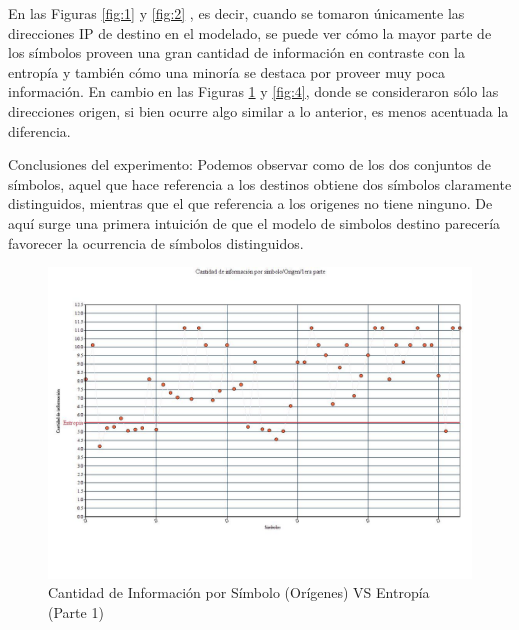 En las Figuras \ref{fig:1} y \ref{fig:2} , es decir, cuando se tomaron únicamente las direcciones IP de destino en el modelado, se puede ver cómo la mayor parte de los símbolos proveen una gran cantidad de información en contraste con la entropía y también cómo una minoría se destaca por proveer muy poca información. En cambio en las Figuras \ref{fig:3} y \ref{fig:4}, donde se consideraron sólo las direcciones origen, si bien ocurre algo similar a lo anterior, es menos acentuada la diferencia.

Conclusiones del experimento: Podemos observar como de los dos conjuntos de símbolos, aquel que hace referencia a los destinos obtiene dos símbolos claramente distinguidos, mientras que el que referencia a los origenes no tiene ninguno. De aquí surge una primera intuición de que el modelo de simbolos destino parecería favorecer la ocurrencia de símbolos distinguidos.

\begin{figure}[H]
  \centering
    \includegraphics[scale=0.45]{imagenes/graficos/entropiaCantInf/02origen1eraParte.jpg}
  \caption{Cantidad de Información por Símbolo (Orígenes) VS Entropía (Parte 1)}
  \label{fig:3}
\end{figure}


